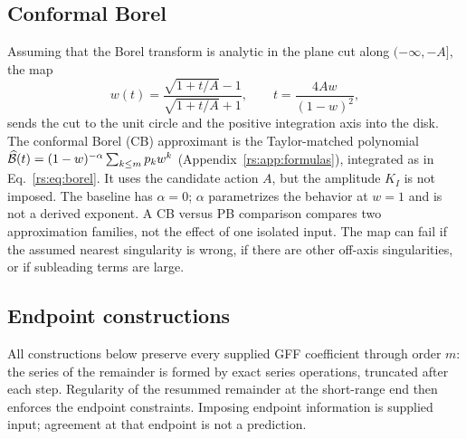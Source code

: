 \subsection{Conformal Borel}\label{rs:sec:cb}
Assuming that the Borel transform is analytic in the plane cut along $(-\infty,-A]$, the
map
\begin{equation}
 w(t)=\frac{\sqrt{1+t/A}-1}{\sqrt{1+t/A}+1},\qquad t=\frac{4Aw}{(1-w)^2},
 \label{rs:eq:wmap}
\end{equation}
sends the cut to the unit circle and the positive integration axis into the disk. The
conformal Borel (CB) approximant is the Taylor-matched polynomial
$\widehat{\mathcal B}(t)=(1-w)^{-\alpha}\sum_{k\le m}p_kw^k$ (Appendix~\ref{rs:app:formulas}),
integrated as in Eq.~\eqref{rs:eq:borel}. It uses the candidate action $A$, but the amplitude
$K_I$ is not imposed. The baseline has $\alpha=0$; $\alpha$ parametrizes the behavior at
$w=1$ and is not a derived exponent. A CB versus PB comparison compares two approximation
families, not the effect of one isolated input. The map can fail if the assumed nearest
singularity is wrong, if there are other off-axis singularities, or if subleading terms
are large.

\subsection{Endpoint constructions}\label{rs:sec:endpoint}
All constructions below preserve every supplied GFF coefficient through order $m$:
the series of the remainder is formed by exact series operations, truncated after each
step. Regularity of the resummed remainder at the short-range end then enforces the
endpoint constraints. Imposing endpoint information is supplied input; agreement at
that endpoint is not a prediction.

